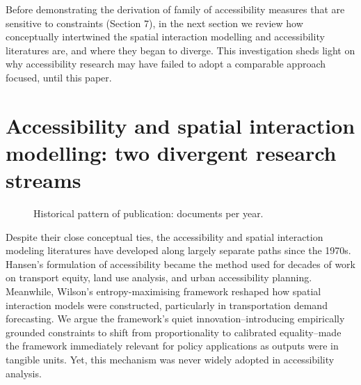 \documentclass[
  10pt,
  letterpaper,
]{article}
\begin{document}
Before demonstrating the derivation of family of accessibility measures
that are sensitive to constraints (Section 7), in the next section we
review how conceptually intertwined the spatial interaction modelling
and accessibility literatures are, and where they began to diverge. This
investigation sheds light on why accessibility research may have failed
to adopt a comparable approach focused, until this paper.

\section{Accessibility and spatial interaction modelling: two divergent
research
streams}\label{accessibility-and-spatial-interaction-modelling-two-divergent-research-streams}

\begin{figure}[H]


\caption{\label{fig-docs-per-year}Historical pattern of publication:
documents per year.}

\end{figure}%

Despite their close conceptual ties, the accessibility and spatial
interaction modeling literatures have developed along largely separate
paths since the 1970s. Hansen's \citep{hansen1959} formulation of
accessibility became the method used for decades of work on transport
equity, land use analysis, and urban accessibility planning. Meanwhile,
Wilson's \citep{wilson1971} entropy-maximising framework reshaped how
spatial interaction models were constructed, particularly in
transportation demand forecasting. We argue the framework's quiet
innovation--introducing empirically grounded constraints to shift from
proportionality to calibrated equality--made the framework immediately
relevant for policy applications as outputs were in tangible units. Yet,
this mechanism was never widely adopted in accessibility analysis.
\end{document}
